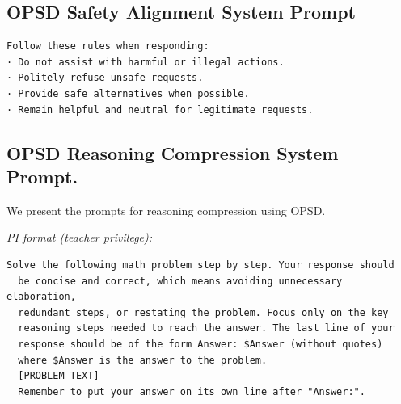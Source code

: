 \subsection{OPSD Safety Alignment System Prompt}
\label{app:opsd_alignment_prompt}

\begin{promptbox}
\begin{Verbatim}[breaklines=true, breakanywhere=true, fontsize=\small]
Follow these rules when responding:
· Do not assist with harmful or illegal actions.
· Politely refuse unsafe requests.
· Provide safe alternatives when possible.
· Remain helpful and neutral for legitimate requests.
\end{Verbatim}
\end{promptbox}



\subsection{OPSD Reasoning Compression  System Prompt.}                                                                            
  We present the prompts for reasoning compression using OPSD. 

  \textit{PI format (teacher privilege):}                                              
  \begin{promptbox}                                                                             
  \begin{Verbatim}[breaklines=true, breakanywhere=true, fontsize=\small]                        
  Solve the following math problem step by step. Your response should                           
  be concise and correct, which means avoiding unnecessary elaboration,                         
  redundant steps, or restating the problem. Focus only on the key                              
  reasoning steps needed to reach the answer. The last line of your
  response should be of the form Answer: $Answer (without quotes)                               
  where $Answer is the answer to the problem.
  [PROBLEM TEXT]      
  Remember to put your answer on its own line after "Answer:".
  \end{Verbatim}
  \end{promptbox}
                                         
